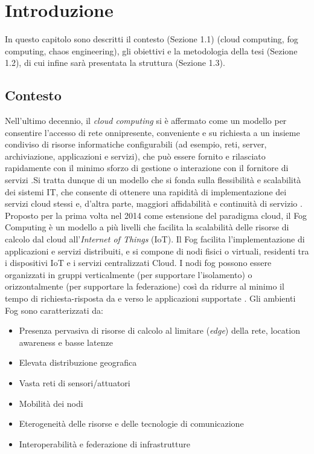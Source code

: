 \chapter{Introduzione}
In questo capitolo sono descritti il contesto (Sezione 1.1) (cloud computing, fog computing, chaos engineering), gli obiettivi e la metodologia della tesi (Sezione 1.2), di cui infine sarà presentata la struttura (Sezione 1.3).
    \section{Contesto}
    Nell'ultimo decennio, il \textit{cloud computing} si è affermato come un modello per consentire l'accesso di rete onnipresente, conveniente e su richiesta a un insieme condiviso di risorse informatiche configurabili (ad esempio, reti, server, archiviazione, applicazioni e servizi), che può essere fornito e rilasciato rapidamente con il minimo sforzo di gestione o interazione con il fornitore di servizi \cite{nistcloud}.Si tratta dunque di un modello che si fonda sulla flessibilità e scalabilità dei sistemi IT, che consente di ottenere una rapidità di implementazione dei servizi cloud stessi e, d’altra parte, maggiori affidabilità e continuità di servizio \cite{treccani}. Proposto per la prima volta nel 2014 \cite{fog} come estensione del paradigma cloud, il Fog Computing è un modello a più livelli che facilita la scalabilità delle risorse di calcolo dal cloud all'\textit{Internet of Things} (IoT). Il Fog facilita l'implementazione di applicazioni e servizi distribuiti, e si compone di nodi fisici o virtuali, residenti tra i dispositivi IoT e i servizi centralizzati Cloud. I nodi fog possono essere organizzati in gruppi verticalmente (per supportare l'isolamento) o orizzontalmente (per supportare la federazione) così da ridurre al minimo il tempo di richiesta-risposta da e verso le applicazioni supportate \cite{nistfog}. Gli ambienti Fog sono caratterizzati da:
    \begin{itemize}
        \item Presenza pervasiva di risorse di calcolo al limitare (\textit{edge}) della rete, location awareness e basse latenze
        \item Elevata distribuzione geografica
        \item Vasta reti di sensori/attuatori
        \item Mobilità dei nodi
        \item Eterogeneità delle risorse e delle tecnologie di comunicazione
        \item Interoperabilità e federazione di infrastrutture
    \end{itemize}
